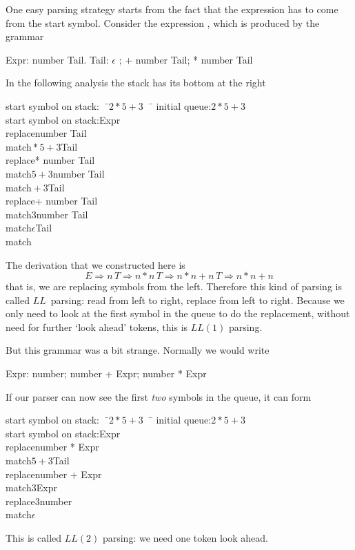 One easy parsing strategy starts from the fact that the expression has
to come from the start symbol. Consider the expression ,
which is produced by the grammar
\begin{bnf}
Expr: number Tail.
Tail: $\epsilon$ ; + number Tail; * number Tail
\end{bnf}
In the following analysis the stack has its bottom at the right
\begin{tabbing}
start symbol on stack:$\quad$\=${}2*5+3{}\quad$\=\kill
initial queue:\>$2*5+3$\\
start symbol on stack:\>\>Expr\\
replace\>\>number Tail\\
match\>${}*5+3$\>Tail\\
replace\>\>* number Tail\\
match\>$5+3$\>number Tail\\
match\>${}+3$\>Tail\\
replace\>\>+ number Tail\\
match\>$3$\>number Tail\\
match\>$\epsilon$\>Tail\\
match
\end{tabbing}
The derivation that we constructed here is
\[ E\Rightarrow n\, T\Rightarrow n*n\,T\Rightarrow
    n*n+n\,T\Rightarrow n*n+n \]
that is, we are replacing symbols from the left. Therefore this kind
of parsing is called $LL$~parsing: read from left to right, replace
from left to right. Because we only need to look at the first symbol in
the queue to do the replacement, without need for further
`look ahead' tokens, this is $LL(1)$ parsing.

But this grammar was a bit strange. Normally we would write
\begin{bnf}
Expr: number; number + Expr; number * Expr
\end{bnf}
If our parser can now see the first \emph{two} symbols in the queue,
it can form
\begin{tabbing}
start symbol on stack:$\quad$\=${}2*5+3{}\quad$\=\kill
initial queue:\>$2*5+3$\\
start symbol on stack:\>\>Expr\\
replace\>\>number * Expr\\
match\>${}5+3$\>Tail\\
replace\>\>number + Expr\\
match\>$3$\>Expr\\
replace\>$3$\>number\\
match\>$\epsilon$
\end{tabbing}
This is called $LL(2)$ parsing: we need one token look ahead.

